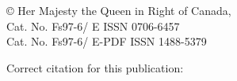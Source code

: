 \vspace*{\fill}
\begin{center}
\begin{minipage}{\widthof{\copyright{} Her Majesty the Queen in Right of Canada, \trYear{}}}
\copyright{} Her Majesty the Queen in Right of Canada, \trYear{}\\
Cat. No. Fs97-6/\trReportNum{} E \hfill ISSN 0706-6457\\
Cat. No. Fs97-6/\trReportNum{} E-PDF \hfill ISSN 1488-5379
\end{minipage}
\end{center}
\par
\bigskip
\noindent
Correct citation for this publication:
\bigskip
\par
\trReference{}
\clearpage
